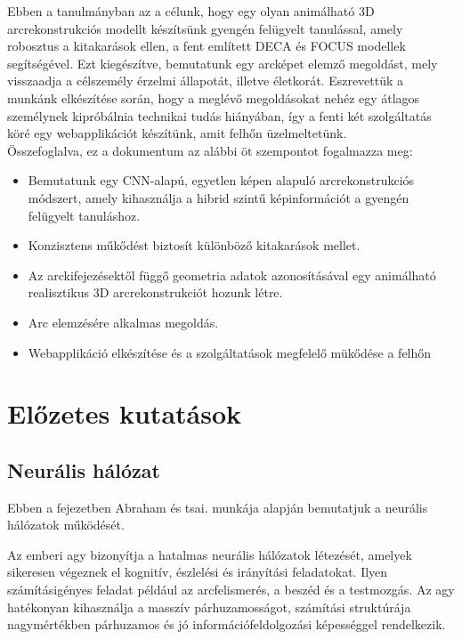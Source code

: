 \documentclass[12pt,a4]{article}
\begin{document}
        Ebben a tanulmányban az a célunk, hogy egy olyan animálható 3D arcrekonstrukciós modellt készítsünk gyengén felügyelt tanulással, amely robosztus a kitakarások ellen, a fent említett DECA és FOCUS modellek segítségével. Ezt kiegészítve, bemutatunk egy arcképet elemző megoldást, mely visszaadja a célszemély érzelmi állapotát, illetve életkorát. Eszrevettük a munkánk elkészítése során, hogy a meglévő megoldásokat nehéz egy átlagos személynek kipróbálnia technikai tudás hiányában, így a fenti két szolgáltatás köré egy webapplikációt készítünk, amit felhőn üzelmeltetünk.\\

        Összefoglalva, ez a dokumentum az alábbi öt szempontot fogalmazza meg:
        \begin{itemize}
	       \item Bemutatunk egy CNN-alapú, egyetlen képen alapuló arcrekonstrukciós módszert, amely kihasználja a hibrid szintű képinformációt a gyengén felügyelt tanuláshoz.
	       \item Konzisztens műkődést biztosít különböző kitakarások mellet.
	       \item Az arckifejezésektől függő geometria adatok azonosításával egy animálható realisztikus 3D arcrekonstrukciót hozunk létre.
	       \item Arc elemzésére alkalmas megoldás.
	       \item Webapplikáció elkészítése és a szolgáltatások megfelelő mükődése a felhőn
        \end{itemize}

    \section{Előzetes kutatások}
	\subsection{Neurális hálózat}
    Ebben a fejezetben Abraham és tsai. munkája alapján bemutatjuk a neurális hálózatok működését.
    
	\label{NN}
	Az emberi agy bizonyítja a hatalmas neurális hálózatok létezését, amelyek sikeresen végeznek el kognitív, észlelési és irányítási feladatokat. Ilyen számításigényes feladat például az arcfelismerés, a beszéd és a testmozgás. Az agy hatékonyan kihasználja a masszív párhuzamosságot, számítási struktúrája nagymértékben párhuzamos és jó információfeldolgozási képességgel rendelkezik.
	
\end{document}
